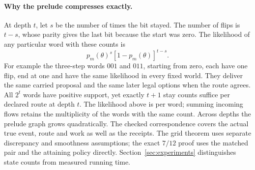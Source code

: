 \paragraph{Why the prelude compresses exactly.}
At depth \(t\), let \(s\) be the number of times the bit stayed. The number of flips is \(t-s\), whose parity gives the last bit because the start was zero. The likelihood of any particular word with these counts is
\[
               p_m(\theta)^s[1-p_m(\theta)]^{t-s}.
\]
For example the three-step words \(001\) and \(011\), starting from zero, each have one flip, end at one and have the same likelihood in every fixed world. They deliver the same carried proposal and the same later legal options when the route agrees. All \(2^t\) words have positive support, yet exactly \(t+1\) stay counts suffice per declared route at depth \(t\). The likelihood above is per word; summing incoming flows retains the multiplicity of the words with the same count. Across depths the prelude graph grows quadratically. The checked correspondence covers the actual true event, route and work as well as the receipts. The grid theorem uses separate discrepancy and smoothness assumptions; the exact \(7/12\) proof uses the matched pair and the attaining policy directly. Section~\ref{sec:experiments} distinguishes state counts from measured running time.
